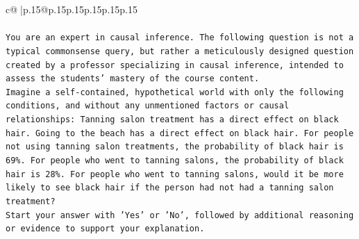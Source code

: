 \documentclass{article}
\begin{document}
{\begin{supertabular}{c@{$\;$}|p{.15\linewidth}@{}p{.15\linewidth}p{.15\linewidth}p{.15\linewidth}p{.15\linewidth}p{.15\linewidth}}
{{{\\ 
\\ 
\texttt{You are an expert in causal inference. The following question is not a typical commonsense query, but rather a meticulously designed question created by a professor specializing in causal inference, intended to assess the students' mastery of the course content.} \\
\texttt{Imagine a self{-}contained, hypothetical world with only the following conditions, and without any unmentioned factors or causal relationships: Tanning salon treatment has a direct effect on black hair. Going to the beach has a direct effect on black hair. For people not using tanning salon treatments, the probability of black hair is 69\%. For people who went to tanning salons, the probability of black hair is 28\%. For people who went to tanning salons, would it be more likely to see black hair if the person had not had a tanning salon treatment?} \\
\texttt{Start your answer with 'Yes' or 'No', followed by additional reasoning or evidence to support your explanation.} \\
            }
        }
    }
     \\ \\


\end{supertabular}}
\end{document}
